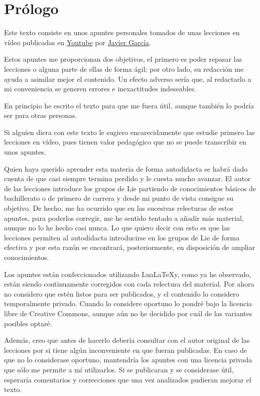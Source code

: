 \chapter{Prólogo}
Este texto consiste en unos apuntes personales tomados
de unas lecciones en vídeo publicadas en
\href{%
  https://www.youtube.com/watch?v=4NE-KNwHKSI\&list=PLAnA8FVrBl8DTFTMP8kXbDnRJHQKqfjaw
}
{Youtube}
por \href{https://www.patreon.com/JavierGarcia/}{Javier García}.

Estos apuntes me proporcionan dos objetivos, el primero es poder repasar las
lecciones o alguna parte de ellas de forma ágil; por otro lado, su redacción
me ayuda a asimilar mejor el contenido. Un efecto adverso sería que, al
redactarlo a mi conveniencia se generen errores e inexactitudes indeseables.

En principio he escrito el texto para que me fuera útil, aunque también lo
podría ser para otras personas.

Si alguien diera con este texto le sugiero encarecidamente que estudie
primero las lecciones en vídeo, pues tienen valor pedagógico que no se puede
transcribir en unos apuntes.

Quien haya querido aprender esta materia de forma autodidacta se habrá
dado cuenta de que casi siempre termina perdido y le cuesta mucho avanzar.
El autor de las lecciones introduce los grupos de Lie partiendo de
conocimientos básicos de bachillerato o de primero de carrera y desde mi punto
de vista consigue su objetivo.
De hecho, me ha ocurrido que en las sucesivas relecturas de estos apuntes, para
poderlos corregir, me he sentido tentado a añadir más material, aunque no
lo he hecho casi nunca. Lo que quiero decir con esto es que las lecciones
permiten al autodidacta introducirse en los grupos de Lie de forma efectiva
y por esta razón se encontrará,  posteriormente,  en disposición de ampliar
conocimientos.

Los apuntes están confeccionados utilizando Lua\LaTeX y, como ya he observado,
están siendo continuamente corregidos con cada relectura del material.
Por ahora no considero que estén listos para ser publicados, y el contenido
lo considero temporalmente privado. Cuando lo considere oportuno lo pondré
bajo la licencia libre de Creative Commons, aunque aún no he decidido por
cuál de las variantes posibles optaré.

Además, creo que antes de hacerlo debería consultar con el autor original
de las lecciones por si tiene algún inconveniente en que fueran publicadas.
En caso de que no lo considerase oportuno, mantendría los apuntes con una
licencia privada que sólo me permite a mí utilizarlos. Si se publicaran
y se considerase útil, esperaría comentarios y correcciones que una
vez analizados pudieran mejorar el texto.


 
